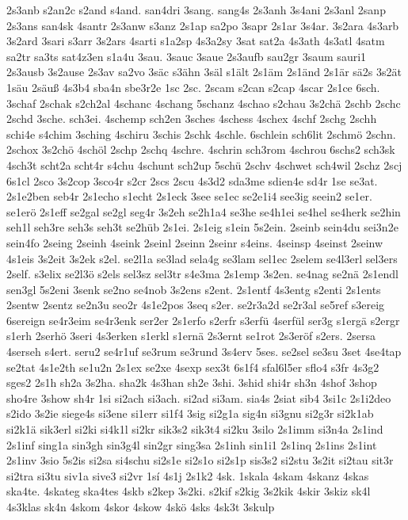 {2s3anb
s2an2c
s2and
s4and.
san4dri
3sang.
sang4s
2s3anh
3s4ani
2s3anl
2sanp
2s3ans
san4sk
4santr
2s3anw
s3anz
2s1ap
sa2po
3sapr
2s1ar
3s4ar.
3s2ara
4s3arb
3s2ard
3sari
s3arr
3s2ars
4sarti
s1a2sp
4s3a2sy
3sat
sat2a
4s3ath
4s3atl
4satm
sa2tr
sa3ts
sat4z3en
s1a4u
3sau.
3sauc
3saue
2s3aufb
sau2gr
3saum
sauri1
2s3ausb
3s2ause
2s3av
sa2vo
3säc
s3ähn
3säl
s1ält
2s1äm
2s1änd
2s1är
sä2s
3s2ät
1säu
2säuß
4s3b4
sba4n
sbe3r2e
1sc
2sc.
2scam
s2can
s2cap
4scar
2s1ce
6sch.
3schaf
2schak
s2ch2al
4schanc
4schang
5schanz
4schao
s2chau
3s2chä
2schb
2schc
2schd
3sche.
sch3ei.
4schemp
sch2en
3sches
4schess
4schex
4schf
2schg
2schh
schi4e
s4chim
3sching
4schiru
3schis
2schk
4schle.
6schlein
sch6lit
2schmö
2schn.
2schox
3s2chö
4schöl
2schp
2schq
4schre.
4schrin
sch3rom
4schrou
6schs2
sch3sk
4sch3t
scht2a
scht4r
s4chu
4schunt
sch2up
5schü
2schv
4schwet
sch4wil
2schz
2scj
6s1cl
2sco
3s2cop
3sco4r
s2cr
2scs
2scu
4s3d2
sda3me
sdien4e
sd4r
1se
se3at.
2s1e2ben
seb4r
2s1echo
s1echt
2s1eck
3see
se1ec
se2e1i4
see3ig
seein2
se1er.
se1erö
2s1eff
se2gal
se2gl
seg4r
3s2eh
se2h1a4
se3he
se4h1ei
se4hel
se4herk
se2hin
seh1l
seh3re
seh3s
seh3t
se2hüb
2s1ei.
2s1eig
s1ein
5s2ein.
2seinb
sein4du
sei3n2e
sein4fo
2seing
2seinh
4seink
2seinl
2seinn
2seinr
s4eins.
4seinsp
4seinst
2seinw
4s1eis
3s2eit
3s2ek
s2el.
se2l1a
se3lad
sela4g
se3lam
sel1ec
2selem
se4l3erl
sel3ers
2self.
s3elix
se2l3ö
s2els
sel3sz
sel3tr
s4e3ma
2s1emp
3s2en.
se4nag
se2nä
2s1endl
sen3gl
5s2eni
3senk
se2no
se4nob
3s2ens
s2ent.
2s1entf
4s3entg
s2enti
2s1ents
2sentw
2sentz
se2n3u
seo2r
4s1e2pos
3seq
s2er.
se2r3a2d
se2r3al
se5ref
s3ereig
6sereign
se4r3eim
se4r3enk
ser2er
2s1erfo
s2erfr
s3erfü
4serfül
ser3g
s1ergä
s2ergr
s1erh
2serhö
3seri
4s3erken
s1erkl
s1ernä
2s3ernt
se1rot
2s3eröf
s2ers.
2sersa
4serseh
s4ert.
seru2
se4r1uf
se3rum
se3rund
3s4erv
5ses.
se2sel
se3su
3set
4se4tap
se2tat
4s1e2th
se1u2n
2s1ex
se2xe
4sexp
sex3t
6s1f4
sfal6l5er
sflo4
s3fr
4s3g2
sges2
2s1h
sh2a
3s2ha.
sha2k
4s3han
sh2e
3shi.
3shid
shi4r
sh3n
4shof
3shop
sho4re
3show
sh4r
1si
si2ach
si3ach.
si2ad
si3am.
sia4s
2siat
sib4
3si1c
2s1i2deo
s2ido
3s2ie
siege4s
si3ene
si1err
si1f4
3sig
si2g1a
sig4n
si3gnu
si2g3r
si2k1ab
si2k1ä
sik3erl
si2ki
si4k1l
si2kr
sik3s2
sik3t4
si2ku
3silo
2s1imm
si3n4a
2s1ind
2s1inf
sing1a
sin3gh
sin3g4l
sin2gr
sing3sa
2s1inh
sin1i1
2s1inq
2s1ins
2s1int
2s1inv
3sio
5s2is
si2sa
si4schu
si2s1e
si2s1o
si2s1p
sis3s2
si2stu
3s2it
si2tau
sit3r
si2tra
si3tu
siv1a
sive3
si2vr
1sí
4s1j
2s1k2
4sk.
1skala
4skam
4skanz
4skas
ska4te.
4skateg
ska4tes
4skb
s2kep
3s2ki.
s2kif
s2kig
3s2kik
4skir
3skiz
sk4l
4s3klas
sk4n
4skom
4skor
4skow
4skö
4sks
4sk3t
3skulp
}
